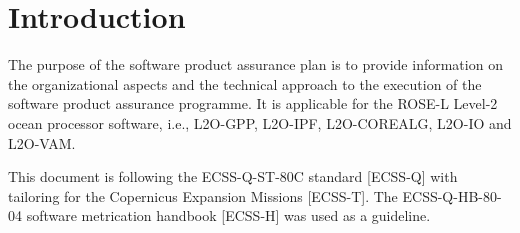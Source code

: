 \section{Introduction}

%

The purpose of the software product assurance plan is to provide information on the organizational aspects and the technical approach to the execution of the software product assurance programme. It is applicable for the ROSE-L Level-2 ocean processor software, i.e., L2O-GPP, L2O-IPF, L2O-COREALG, L2O-IO and L2O-VAM.

This document is following the ECSS-Q-ST-80C standard [ECSS-Q] with tailoring for the Copernicus Expansion Missions [ECSS-T]. The ECSS-Q-HB-80-04 software metrication handbook [ECSS-H] was used as a guideline.